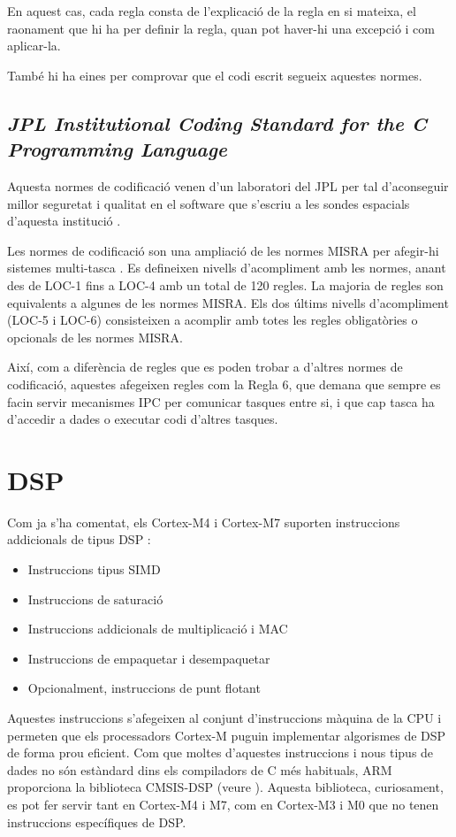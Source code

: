 En aquest cas, cada regla consta de l'explicació de la regla en si mateixa, el raonament que hi ha per definir la regla, quan pot haver-hi una excepció i com aplicar-la.

També hi ha eines per comprovar que el codi escrit segueix aquestes normes.

\section{\em JPL Institutional Coding Standard for the C Programming Language}
Aquesta normes de codificació venen d'un laboratori del JPL per tal d'aconseguir millor seguretat i qualitat en el software que s'escriu a les sondes espacials d'aquesta institució \cite{JPLLARS}.

Les normes de codificació son una ampliació de les normes MISRA per afegir-hi sistemes multi-tasca \cite{JPLCProgramming}. Es defineixen nivells d'acompliment amb les normes, anant des de LOC-1 fins a LOC-4 amb un total de 120 regles. La majoria de regles son equivalents a algunes de les normes MISRA. Els dos últims nivells d'acompliment (LOC-5 i LOC-6) consisteixen a acomplir amb totes les regles obligatòries o opcionals de les normes MISRA.

Així, com a diferència de regles que es poden trobar a d'altres normes de codificació, aquestes afegeixen regles com la Regla 6, que demana que sempre es facin servir mecanismes IPC per comunicar tasques entre si, i que cap tasca ha d'accedir a dades o executar codi d'altres tasques.

\chapter{DSP}
\label{ch:DSP}
Com ja s'ha comentat, els Cortex-M4 i Cortex-M7 suporten instruccions addicionals de tipus \gls{DSP} \cite[173]{GuideCortexM3M4}\cite[255]{DesignersGuide}:
\begin{itemize}
 \item Instruccions tipus \gls{SIMD}
 \item Instruccions de saturació
 \item Instruccions addicionals de multiplicació i \gls{MAC}
 \item Instruccions de empaquetar i desempaquetar
 \item Opcionalment, instruccions de punt flotant
\end{itemize}

Aquestes instruccions s'afegeixen al conjunt d'instruccions màquina de la CPU i permeten que els processadors Cortex-M puguin implementar algorismes de DSP de forma prou eficient. Com que moltes d'aquestes instruccions i nous tipus de dades no són estàndard dins els compiladors de C més habituals, \gls{ARM} proporciona la biblioteca CMSIS-DSP (veure ). Aquesta biblioteca, curiosament, es pot fer servir tant en Cortex-M4 i M7, com en Cortex-M3 i M0 que no tenen instruccions específiques de DSP.

